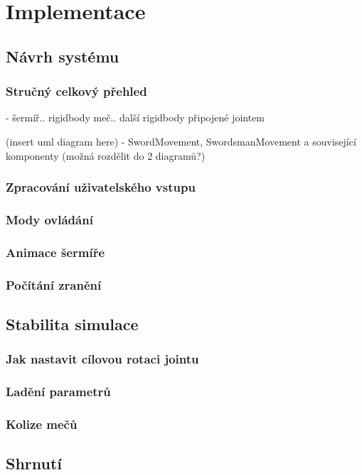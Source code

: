 \chapter{Implementace}

\section{Návrh systému}

\subsection{Stručný celkový přehled}

- šermíř.. rigidbody
  meč.. další rigidbody připojené jointem

(insert uml diagram here)
- SwordMovement, SwordsmanMovement a související komponenty (možná rozdělit do 2 diagramů?)


\subsection{Zpracování uživatelského vstupu}

\subsection{Mody ovládání}

\subsection{Animace šermíře}

\subsection{Počítání zranění}


\section{Stabilita simulace}

\subsection{Jak nastavit cílovou rotaci jointu} \label{howToSetJointsTargetRotationSection}

\subsection{Ladění parametrů} \label{swordParameterTweaksSection}

\subsection{Kolize mečů} \label{swordCollisionsSection}


\section{Shrnutí}
